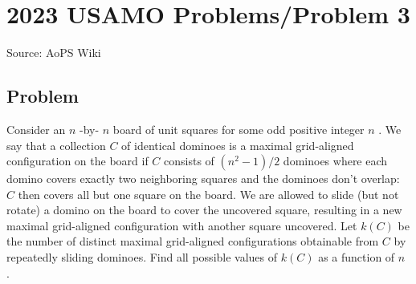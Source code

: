 \documentclass[12pt]{article}
\begin{document}
\section*{{2023 USAMO Problems/Problem 3}}
Source: AoPS Wiki

\subsection*{Problem}
Consider an $n$ -by- $n$ board of unit squares for some odd positive integer $n$ . We say that a collection $C$ of identical dominoes is a maximal grid-aligned configuration on the board if $C$ consists of $(n^2-1)/2$ dominoes where each domino covers exactly two neighboring squares and the dominoes don't overlap: $C$ then covers all but one square on the board. We are allowed to slide (but not rotate) a domino on the board to cover the uncovered square, resulting in a new maximal grid-aligned configuration with another square uncovered. Let $k(C)$ be the number of distinct maximal grid-aligned configurations obtainable from $C$ by repeatedly sliding dominoes. Find all possible values of $k(C)$ as a function of $n$ .
\end{document}
